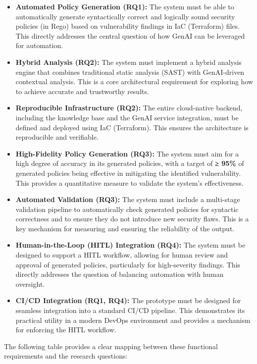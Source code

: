\begin{itemize}
    \item \textbf{Automated Policy Generation (RQ1):} The system must be able to automatically generate syntactically correct and logically sound security policies (in Rego) based on vulnerability findings in IaC (Terraform) files. This directly addresses the central question of how GenAI can be leveraged for automation.
    \item \textbf{Hybrid Analysis (RQ2):} The system must implement a hybrid analysis engine that combines traditional static analysis (SAST) with GenAI-driven contextual analysis. This is a core architectural requirement for exploring how to achieve accurate and trustworthy results.
    \item \textbf{Reproducible Infrastructure (RQ2):} The entire cloud-native backend, including the knowledge base and the GenAI service integration, must be defined and deployed using IaC (Terraform). This ensures the architecture is reproducible and verifiable.
    \item \textbf{High-Fidelity Policy Generation (RQ3):} The system must aim for a high degree of accuracy in its generated policies, with a target of \textbf{≥ 95\%} of generated policies being effective in mitigating the identified vulnerability. This provides a quantitative measure to validate the system's effectiveness.
    \item \textbf{Automated Validation (RQ3):} The system must include a multi-stage validation pipeline to automatically check generated policies for syntactic correctness and to ensure they do not introduce new security flaws. This is a key mechanism for measuring and ensuring the reliability of the output.
    \item \textbf{Human-in-the-Loop (HITL) Integration (RQ4):} The system must be designed to support a HITL workflow, allowing for human review and approval of generated policies, particularly for high-severity findings. This directly addresses the question of balancing automation with human oversight.
    \item \textbf{CI/CD Integration (RQ1, RQ4):} The prototype must be designed for seamless integration into a standard CI/CD pipeline. This demonstrates its practical utility in a modern DevOps environment and provides a mechanism for enforcing the HITL workflow.
\end{itemize}

The following table provides a clear mapping between these functional requirements and the research questions:

